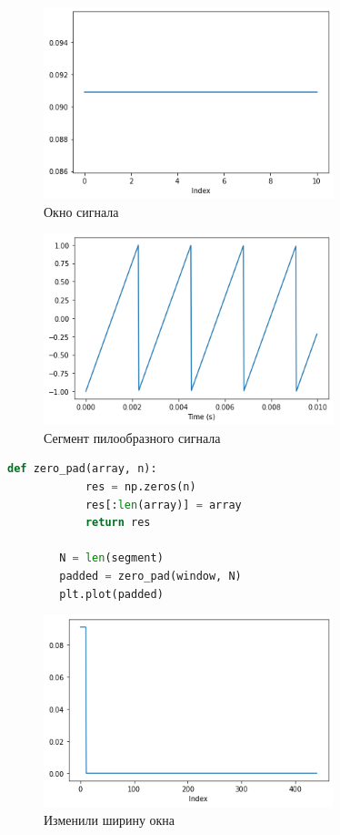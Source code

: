 \documentclass[a4paper, 12pt]{report}
\begin{document}
	\begin{figure}[H]
		\centering
		\includegraphics[width=0.75\textwidth]{test2.png}
		\caption{Окно сигнала}
		\label{fig:test2}
	\end{figure}
	\begin{figure}[H]
		\centering
		\includegraphics[width=0.75\textwidth]{test3.png}
		\caption{Сегмент пилообразного сигнала}
		\label{fig:test3}
	\end{figure}
	\begin{lstlisting}[language=Python,caption=Сделали нужную ширину окна]
		def zero_pad(array, n):
			res = np.zeros(n)
			res[:len(array)] = array
			return res

		N = len(segment)
		padded = zero_pad(window, N)
		plt.plot(padded)
	\end{lstlisting}
	\begin{figure}[H]
		\centering
		\includegraphics[width=0.75\textwidth]{test4.png}
		\caption{Изменили ширину окна}
		\label{fig:test4}
	\end{figure}
\end{document}
